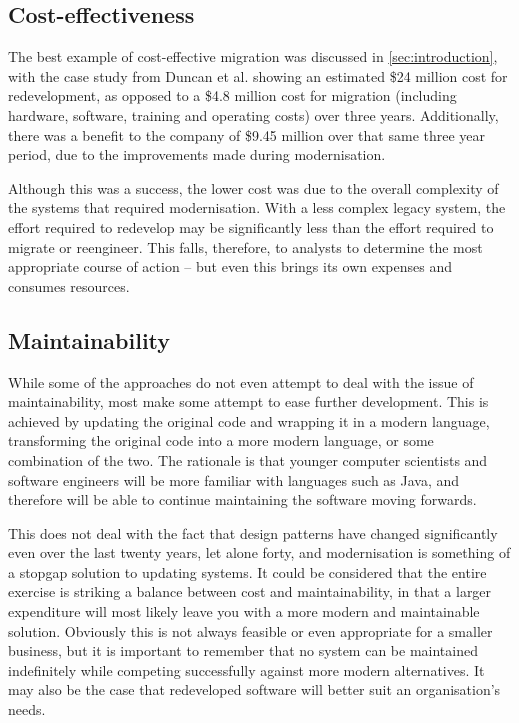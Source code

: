\documentclass[12pt,journal,compsoc]{IEEEtran}
\begin{document}
\subsection{Cost-effectiveness}
\label{subsec:costeffectiveness}
The best example of cost-effective migration was discussed in \autoref{sec:introduction}, with the case study from Duncan et al.\cite{Duncan1996} showing an estimated \$24 million cost for redevelopment, as opposed to a \$4.8 million cost for migration (including hardware, software, training and operating costs) over three years. Additionally, there was a benefit to the company of \$9.45 million over that same three year period, due to the improvements made during modernisation.

Although this was a success, the lower cost was due to the overall complexity of the systems that required modernisation. With a less complex legacy system, the effort required to redevelop may be significantly less than the effort required to migrate or reengineer. This falls, therefore, to analysts to determine the most appropriate course of action -- but even this brings its own expenses and consumes resources.

\subsection{Maintainability}
\label{subsec:maintainability}
While some of the approaches do not even attempt to deal with the issue of maintainability\cite{Stroulia2002}, most make some attempt to ease further development. This is achieved by updating the original code and wrapping it in a modern language, transforming the original code into a more modern language, or some combination of the two. The rationale is that younger computer scientists and software engineers will be more familiar with languages such as Java\cite{Sneed2013}, and therefore will be able to continue maintaining the software moving forwards.

This does not deal with the fact that design patterns have changed significantly even over the last twenty years, let alone forty, and modernisation is something of a stopgap solution to updating systems. It could be considered that the entire exercise is striking a balance between cost and maintainability, in that a larger expenditure will most likely leave you with a more modern and maintainable solution. Obviously this is not always feasible or even appropriate for a smaller business, but it is important to remember that no system can be maintained indefinitely while competing successfully against more modern alternatives. It may also be the case that redeveloped software will better suit an organisation's needs.
\end{document}

